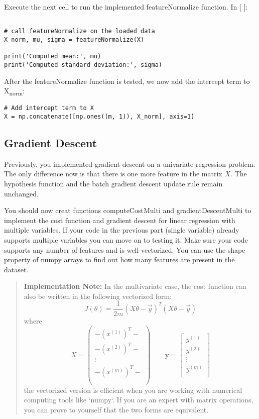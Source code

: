 \documentclass[11pt]{article}
\begin{document}
Execute the next cell to run the implemented featureNormalize function.
In [ ]:
\begin{verbatim}

# call featureNormalize on the loaded data
X_norm, mu, sigma = featureNormalize(X)

print('Computed mean:', mu)
print('Computed standard deviation:', sigma)
\end{verbatim}

After the featureNormalize function is tested, we now add the intercept term to X\textsubscript{norm}:
\begin{verbatim}
# Add intercept term to X
X = np.concatenate([np.ones((m, 1)), X_norm], axis=1)

\end{verbatim}
\subsection{Gradient Descent}
\label{sec:org38df41d}

Previously, you implemented gradient descent on a univariate regression problem. The only difference now is that there is one more feature in the matrix \(X\). The hypothesis function and the batch gradient descent update rule remain unchanged.

You should now creat functions computeCostMulti and gradientDescentMulti to implement the cost function and gradient descent for linear regression with multiple variables. If your code in the previous part (single variable) already supports multiple variables you can move on to testing it. Make sure your code supports any number of features and is well-vectorized. You can use the shape property of numpy arrays to find out how many features are present in the dataset.
\begin{quote}
\textbf{\textbf{Implementation Note:}} In the multivariate case, the cost function can also be written in the following vectorized form: $$ J(\theta) = \frac{1}{2m}(X\theta - \vec{y})^T(X\theta - \vec{y}) $$ where $$ X = \begin{pmatrix} - (x^{(1)})^T - \\ - (x^{(2)})^T - \\ \vdots \\ - (x^{(m)})^T - \\ \\ \end{pmatrix} \qquad \mathbf{y} = \begin{bmatrix} y^{(1)} \\ y^{(2)} \\ \vdots \\ y^{(m)} \\\end{bmatrix}$$ the vectorized version is efficient when you are working with numerical computing tools like `numpy`. If you are an expert with matrix operations, you can prove to yourself that the two forms are equivalent.
\end{quote}
\end{document}
